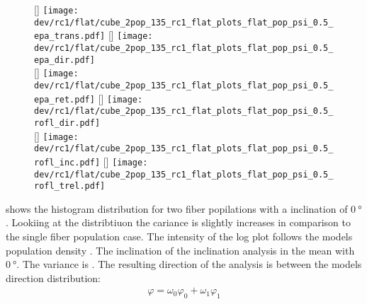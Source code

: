 % 
\begin{figure}[!p]
\centering
\setlength{\width}{0.45\textwidth}
[\width]{
\texttt{[image: dev/rc1/flat/cube\_2pop\_135\_rc1\_flat\_plots\_flat\_pop\_psi\_0.5\_epa\_trans.pdf]}}\hfill
{}[\width]{
\texttt{[image: dev/rc1/flat/cube\_2pop\_135\_rc1\_flat\_plots\_flat\_pop\_psi\_0.5\_epa\_dir.pdf]}}
\\[2em]
[\width]{
\texttt{[image: dev/rc1/flat/cube\_2pop\_135\_rc1\_flat\_plots\_flat\_pop\_psi\_0.5\_epa\_ret.pdf]}}\hfill
{}[\width]{
\texttt{[image: dev/rc1/flat/cube\_2pop\_135\_rc1\_flat\_plots\_flat\_pop\_psi\_0.5\_rofl\_dir.pdf]}}
\\[2em]
[\width]{
\texttt{[image: dev/rc1/flat/cube\_2pop\_135\_rc1\_flat\_plots\_flat\_pop\_psi\_0.5\_rofl\_inc.pdf]}}\hfill
{}[\width]{
\texttt{[image: dev/rc1/flat/cube\_2pop\_135\_rc1\_flat\_plots\_flat\_pop\_psi\_0.5\_rofl\_trel.pdf]}}
\caption[]{\dummy[flat population psi=0.5 rofl analysis; colors left to right: 0, 30, 60, 90 degree inclination; line: theoretical curve]{}}
\label{fig:flat_05_fiber_pop_rofl}
\end{figure}
% 
 shows the histogram distribution for two fiber popilations with a inclination of $\SI{0}{\degree}$.
Lookiing at the distribtiuon the cariance is slightly increases in comparison to the single fiber population case.
The intensity of the log plot follows the models population density \modelPsi{} .
The inclination of the inclination analysis in the mean with $\SI{0}{\degree}$.
The variance is \dummy{}.
The resulting direction of the analysis is between the models direction distribution:
\begin{align}
    \varphi = \omega_0 \varphi_0 + \omega_1 \varphi_1
\end{align}
% 
% 
% 
